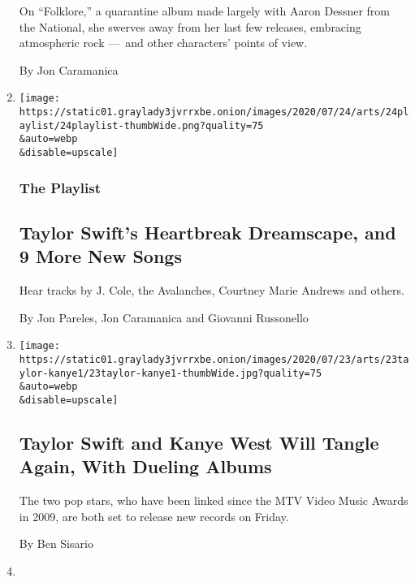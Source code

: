 \begin{enumerate}
  On ``Folklore,'' a quarantine album made largely with Aaron Dessner
  from the National, she swerves away from her last few releases,
  embracing atmospheric rock ---~and other characters' points of view.

  By Jon Caramanica
\item
  \href{/2020/07/24/arts/music/playlist-taylor-swift-j-cole-drake.html}{}

  \texttt{[image: https://static01.graylady3jvrrxbe.onion/images/2020/07/24/arts/24playlist/24playlist-thumbWide.png?quality=75\\\&auto=webp\\\&disable=upscale]}

  \hypertarget{the-playlist}{%
  \subsubsection{The Playlist}\label{the-playlist}}

  \hypertarget{taylor-swifts-heartbreak-dreamscape-and-9-more-new-songs}{%
  \subsection{Taylor Swift's Heartbreak Dreamscape, and 9 More New
  Songs}\label{taylor-swifts-heartbreak-dreamscape-and-9-more-new-songs}}

  Hear tracks by J. Cole, the Avalanches, Courtney Marie Andrews and
  others.

  By Jon Pareles, Jon Caramanica and Giovanni Russonello
\item
  \href{/2020/07/23/arts/music/taylor-swift-kanye-west.html}{}

  \texttt{[image: https://static01.graylady3jvrrxbe.onion/images/2020/07/23/arts/23taylor-kanye1/23taylor-kanye1-thumbWide.jpg?quality=75\\\&auto=webp\\\&disable=upscale]}

  \hypertarget{taylor-swift-and-kanye-west-will-tangle-again-with-dueling-albums}{%
  \subsection{Taylor Swift and Kanye West Will Tangle Again, With
  Dueling
  Albums}\label{taylor-swift-and-kanye-west-will-tangle-again-with-dueling-albums}}

  The two pop stars, who have been linked since the MTV Video Music
  Awards in 2009, are both set to release new records on Friday.

  By Ben Sisario
\item
  \href{/2020/05/14/arts/things-to-do-weekend-coronavirus.html}{}


\end{enumerate}
